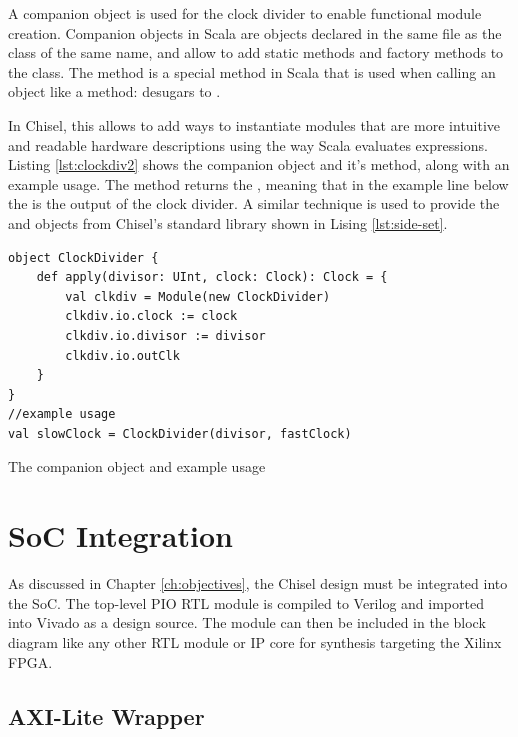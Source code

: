 A companion object is used for the clock divider to enable functional module creation. Companion objects in Scala are objects declared in the same file as the class of the same name, and allow to add static methods and factory methods to the class. The  method is a special method in Scala that is used when calling an object like a method:  desugars to  \cite{scala_book}.

In Chisel, this allows to add ways to instantiate modules that are more intuitive and readable hardware descriptions using the way Scala evaluates expressions. Listing \ref{lst:clockdiv2} shows the  companion object and it's  method, along with an example usage. The method returns the , meaning that in the example line below the  is the output of the clock divider. A similar technique is used to provide the  and  objects from Chisel's standard library shown in Lising \ref{lst:side-set}.

\begin{listing}[h!]
    \centering
    \vspace{0.5cm}
    \begin{verbatim}
object ClockDivider {
    def apply(divisor: UInt, clock: Clock): Clock = {
        val clkdiv = Module(new ClockDivider)
        clkdiv.io.clock := clock
        clkdiv.io.divisor := divisor
        clkdiv.io.outClk
    }
}
//example usage
val slowClock = ClockDivider(divisor, fastClock)
    \end{verbatim}
    \caption{The  companion object and example usage}
    \label{lst:clockdiv2}
\end{listing}

\section{SoC Integration}

As discussed in Chapter \ref{ch:objectives}, the Chisel design must be integrated into the SoC. The top-level PIO RTL module is compiled to Verilog and imported into Vivado as a design source. The module can then be included in the block diagram like any other RTL module or IP core for synthesis targeting the Xilinx FPGA.

\subsection{AXI-Lite Wrapper}

